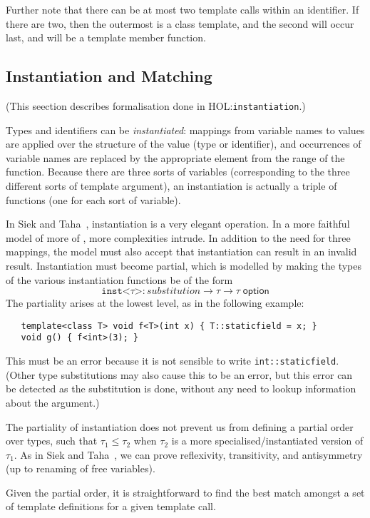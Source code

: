 \documentclass[11pt]{article}
\newcommand{\HOLfile}[1]{HOL:\texttt{#1}}
\begin{document}
Further note that there can be at most two template calls within an
identifier.  If there are two, then the outermost is a class template,
and the second will occur last, and will be a template member
function.

\subsection{Instantiation and Matching}

(This seection describes formalisation done in
\HOLfile{instantiation}.)

\medskip
\noindent Types and identifiers can be \emph{instantiated}: mappings
from variable names to values are applied over the structure of the
value (type or identifier), and occurrences of variable names are
replaced by the appropriate element from the range of the function.
Because there are three sorts of variables (corresponding to the three
different sorts of template argument), an instantiation is actually a
triple of functions (one for each sort of variable).

In Siek and Taha~\cite{DBLP:conf/ecoop/SiekT06}, instantiation is a
very elegant operation.  In a more faithful model of more of \cpp,
more complexities intrude.  In addition to the need for three
mappings, the model must also accept that instantiation can result in
an invalid result.  Instantiation must become partial, which is
modelled by making the types of the various instantiation functions be
of the form
\[
\texttt{inst<}\tau\texttt{>} : \mathit{substitution} \to \tau
\to \tau\;\textsf{option}
\]
The partiality arises at the lowest level, as in the following
example:
\begin{verbatim}
   template<class T> void f<T>(int x) { T::staticfield = x; }
   void g() { f<int>(3); }
\end{verbatim}
This must be an error because it is not sensible to write
\texttt{int::staticfield}.  (Other type substitutions may also cause
this to be an error, but this error can be detected as the
substitution is done, without any need to lookup information about the
argument.)

The partiality of instantiation does not prevent us from defining a
partial order over types, such that $\tau_1 \leq \tau_2$ when $\tau_2$
is a more specialised/instantiated version of $\tau_1$.  As in Siek
and Taha~\cite{DBLP:conf/ecoop/SiekT06}, we can prove reflexivity,
transitivity, and antisymmetry (up to renaming of free variables).

Given the partial order, it is straightforward to find the best match
amongst a set of template definitions for a given template call.
\end{document}
